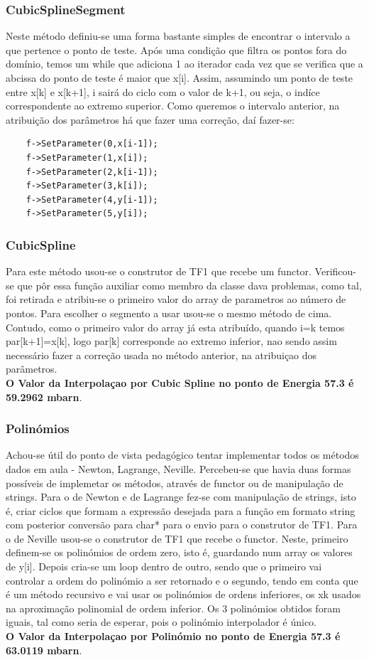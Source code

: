 \documentclass{article}
\begin{document}
\begin{multicols}{2}
  \subsubsection{CubicSplineSegment}
  Neste método definiu-se uma forma bastante simples de encontrar o intervalo a que pertence o ponto de teste. Após uma condição que filtra os pontos fora do domínio, temos um while que adiciona 1 ao iterador cada vez que se verifica que a abcissa do ponto de teste é maior que x[i]. Assim, assumindo um ponto de teste entre x[k] e x[k+1], i sairá do ciclo com o valor de k+1, ou seja, o indíce correspondente ao extremo superior. Como queremos o intervalo anterior, na atribuição dos parâmetros há que fazer uma correção, daí fazer-se:
  \begin{lstlisting}
    f->SetParameter(0,x[i-1]);
    f->SetParameter(1,x[i]);
    f->SetParameter(2,k[i-1]);
    f->SetParameter(3,k[i]);
    f->SetParameter(4,y[i-1]);
    f->SetParameter(5,y[i]);
  \end{lstlisting}

  \subsubsection{CubicSpline}
  Para este método usou-se o construtor de TF1 que recebe um functor. Verificou-se que pôr essa função auxiliar como membro da classe dava problemas, como tal, foi retirada e atribiu-se o primeiro valor do array de parametros ao número de pontos. Para escolher o segmento a usar usou-se o mesmo método de cima. Contudo, como o primeiro valor do array já esta atribuído, quando i=k temos par[k+1]=x[k], logo par[k] corresponde ao extremo inferior,  nao sendo assim necessário fazer a correção usada no método anterior, na atribuiçao dos parâmetros. \\
 \textbf{O Valor da Interpolaçao por Cubic Spline no ponto de Energia 57.3 é 59.2962 mbarn}. 

  \subsubsection{Polinómios}
  Achou-se útil do ponto de vista pedagógico tentar implementar todos os métodos dados em aula - Newton, Lagrange, Neville. Percebeu-se que havia duas formas possíveis de implemetar os métodos, através de functor ou de manipulação de strings. Para o de Newton e de Lagrange fez-se com manipulação de strings, isto é, criar ciclos que formam a expressão desejada para a função em formato string com posterior conversão para char* para o envio para o construtor de TF1. Para o de Neville usou-se o construtor de TF1 que recebe o functor. Neste, primeiro definem-se os polinómios de ordem zero, isto é, guardando num array os valores de y[i]. Depois cria-se um loop dentro de outro, sendo que o primeiro vai controlar a ordem do polinómio a ser retornado e o segundo, tendo em conta que é um método recursivo e vai usar os polinómios de ordens inferiores, os xk usados na aproximação polinomial de ordem inferior.
 Os 3 polinómios obtidos foram iguais, tal como seria de esperar, pois o polinómio interpolador é único.
   \\
 \textbf{O Valor da Interpolaçao por Polinómio no ponto de Energia 57.3 é 63.0119 mbarn}. 

\end{multicols}
\end{document}
